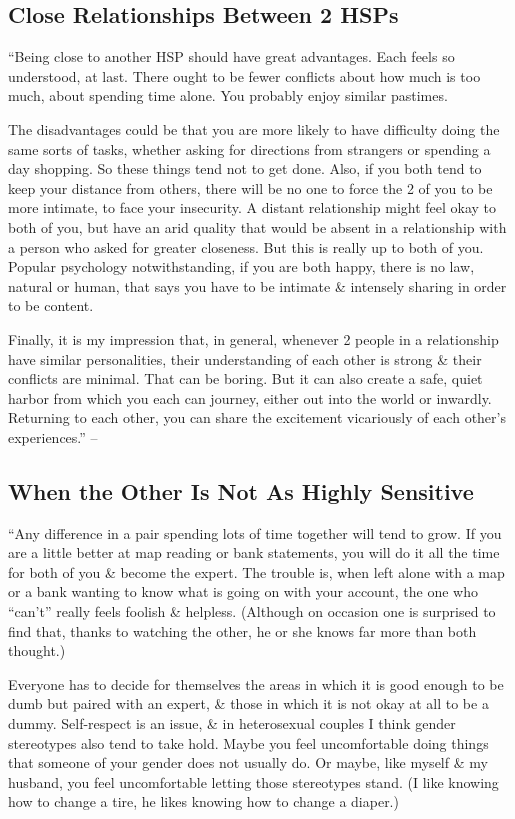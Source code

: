 \documentclass{article}
\numberwithin{equation}{section}
\begin{document}
\subsection{Close Relationships Between 2 HSPs}
``Being close to another HSP should have great advantages. Each feels so understood, at last. There ought to be fewer conflicts about how much is too much, about spending time alone. You probably enjoy similar pastimes.

The disadvantages could be that you are more likely to have difficulty doing the same sorts of tasks, whether asking for directions from strangers or spending a day shopping. So these things tend not to get done. Also, if you both tend to keep your distance from others, there will be no one to force the 2 of you to be more intimate, to face your insecurity. A distant relationship might feel okay to both of you, but have an arid quality that would be absent in a relationship with a person who asked for greater closeness. But this is really up to both of you. Popular psychology notwithstanding, if you are both happy, there is no law, natural or human, that says you have to be intimate \& intensely sharing in order to be content.

Finally, it is my impression that, in general, whenever 2 people in a relationship have similar personalities, their understanding of each other is strong \& their conflicts are minimal. That can be boring. But it can also create a safe, quiet harbor from which you each can journey, either out into the world or inwardly. Returning to each other, you can share the excitement vicariously of each other's experiences.'' -- \cite[pp. 181---182]{Aron2013}

\subsection{When the Other Is Not As Highly Sensitive}
``Any difference in a pair spending lots of time together will tend to grow. If you are a little better at map reading or bank statements, you will do it all the time for both of you \& become the expert. The trouble is, when left alone with a map or a bank wanting to know what is going on with your account, the one who ``can't'' really feels foolish \& helpless. (Although on occasion one is surprised to find that, thanks to watching the other, he or she knows far more than both thought.)

Everyone has to decide for themselves the areas in which it is good enough to be dumb but paired with an expert, \& those in which it is not okay at all to be a dummy. Self-respect is an issue, \& in heterosexual couples I think gender stereotypes also tend to take hold. Maybe you feel uncomfortable doing things that someone of your gender does not usually do. Or maybe, like myself \& my husband, you feel uncomfortable letting those stereotypes stand. (I like knowing how to change a tire, he likes knowing how to change a diaper.)
\end{document}
